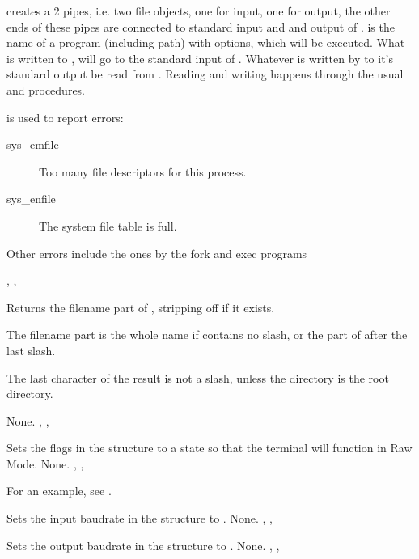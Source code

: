 

{ creates a 2 pipes, i.e. two file objects, one for input, one for
output, the other ends of these pipes are connected to standard input and and
output of .  is the name of a program (including path)
with options, which will be executed.
What is written to , will go to the standard input of
. Whatever is written by  to it's standard output be read from
.
Reading and writing happens through the usual  and
 procedures.
}
{  is used to report errors:
\begin{description}
\item[sys\_emfile] Too many file descriptors for this process.
\item[sys\_enfile] The system file table is full.
\end{description}
Other errors include the ones by the fork and exec programs
}
{, ,}



{Returns the filename part of , stripping off  if it
exists.

The filename part is the whole name if  contains no slash,
or the part of  after the last slash.

The last character of the result is not a slash, unless the directory is the
root directory.
}
{None.}
{, , }



{ 
  Sets the flags in the  structure  to a state so that 
  the terminal will function in Raw Mode.
}
{None.}
{ , , }

For an example, see .

{ 
  Sets the input baudrate in the  structure  to 
  .
}
{None.}
{, , }

{ 
  Sets the output baudrate in the  structure  to
  .
}
{None.}
{, , }

